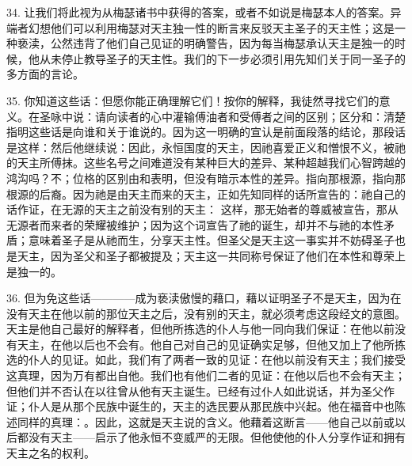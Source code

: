 34. 让我们将此视为从梅瑟诸书中获得的答案，或者不如说是梅瑟本人的答案。异端者幻想他们可以利用梅瑟对天主独一性的断言来反驳天主圣子的天主性；这是一种亵渎，公然违背了他们自己见证的明确警告，因为每当梅瑟承认天主是独一的时候，他从未停止教导圣子的天主性。我们的下一步必须引用先知们关于同一圣子的多方面的言论。\par

35. 你知道这些话：但愿你能正确理解它们！按你的解释，我徒然寻找它们的意义。在圣咏中说：请向读者的心中灌输傅油者和受傅者之间的区别；区分和：清楚指明这些话是向谁和关于谁说的。因为这一明确的宣认是前面段落的结论，那段话是这样：然后他继续说：因此，永恒国度的天主，因祂喜爱正义和憎恨不义，被祂的天主所傅抹。这些名号之间难道没有某种巨大的差异、某种超越我们心智跨越的鸿沟吗？不；位格的区别由和表明，但没有暗示本性的差异。指向那根源，指向那根源的后裔。因为祂是由天主而来的天主，正如先知同样的话所宣告的：祂自己的话作证，在无源的天主之前没有别的天主： 这样，那无始者的尊威被宣告，那从无源者而来者的荣耀被维护；因为这个词宣告了祂的诞生，却并不与祂的本性矛盾；意味着圣子是从祂而生，分享天主性。但圣父是天主这一事实并不妨碍圣子也是天主，因为圣父和圣子都被提及；天主这一共同称号保证了他们在本性和尊荣上是独一的。\par

36. 但为免这些话————成为亵渎傲慢的藉口，藉以证明圣子不是天主，因为在没有天主在他以前的那位天主之后，没有别的天主，就必须考虑这段经文的意图。天主是他自己最好的解释者，但他所拣选的仆人与他一同向我们保证：在他以前没有天主，在他以后也不会有。他自己对自己的见证确实足够，但他又加上了他所拣选的仆人的见证。如此，我们有了两者一致的见证：在他以前没有天主；我们接受这真理，因为万有都出自他。我们也有他们二者的见证：在他以后也不会有天主；但他们并不否认在以往曾从他有天主诞生。已经有过仆人如此说话，并为圣父作证；仆人是从那个民族中诞生的，天主的选民要从那民族中兴起。他在福音中也陈述同样的真理：。因此，这就是天主说的含义。他藉着这断言——他自己以前或以后都没有天主——启示了他永恒不变威严的无限。但他使他的仆人分享作证和拥有天主之名的权利。\par

